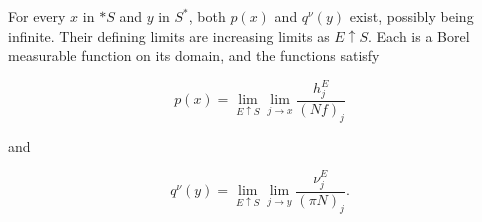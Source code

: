 For every $x$ in $*S$ and $y$ in $S^*$, both $p(x)$ and $q^\nu(y)$ exist, possibly being infinite. Their defining limits are increasing limits as $E \uparrow S$. Each is a Borel measurable function on its domain, and the functions satisfy

$$p(x) = \lim_{E \uparrow S} \lim_{j \to x} \frac{h_j^E}{(Nf)_j}$$

and

$$q^\nu(y) = \lim_{E \uparrow S} \lim_{j \to y} \frac{\nu_j^E}{(\pi N)_j}.$$
